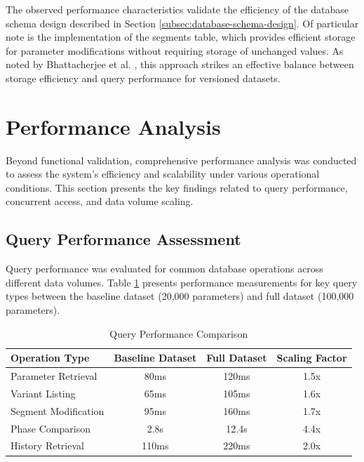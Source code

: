 The observed performance characteristics validate the efficiency of the database schema design described in Section \ref{subsec:database-schema-design}. Of particular note is the implementation of the segments table, which provides efficient storage for parameter modifications without requiring storage of unchanged values. As noted by Bhattacherjee et al. \cite{bhattacherjee2015principles}, this approach strikes an effective balance between storage efficiency and query performance for versioned datasets.

\section{Performance Analysis}
\label{sec:performance-analysis}

Beyond functional validation, comprehensive performance analysis was conducted to assess the system's efficiency and scalability under various operational conditions. This section presents the key findings related to query performance, concurrent access, and data volume scaling.

\subsection{Query Performance Assessment}
\label{subsec:query-performance-assessment}

Query performance was evaluated for common database operations across different data volumes. Table \ref{tab:query-performance-comparison} presents performance measurements for key query types between the baseline dataset (20,000 parameters) and full dataset (100,000 parameters).

\begin{table}[h]
\centering
\caption{Query Performance Comparison}
\label{tab:query-performance-comparison}
\begin{tabular}{|l|c|c|c|}
\hline
\textbf{Operation Type} & \textbf{Baseline Dataset} & \textbf{Full Dataset} & \textbf{Scaling Factor} \\
\hline
Parameter Retrieval & 80ms & 120ms & 1.5x \\
\hline
Variant Listing & 65ms & 105ms & 1.6x \\
\hline
Segment Modification & 95ms & 160ms & 1.7x \\
\hline
Phase Comparison & 2.8s & 12.4s & 4.4x \\
\hline
History Retrieval & 110ms & 220ms & 2.0x \\
\hline
\end{tabular}
\end{table}

